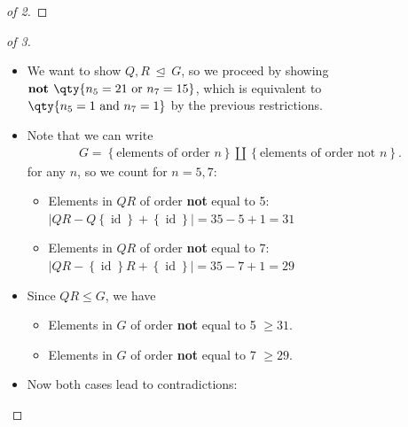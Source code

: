 \begin{solution}
\begin{proof}[of 2]
\end{proof}


\begin{proof}[of 3]

\envlist

\begin{itemize}
\item
  We want to show \(Q, R{~\trianglelefteq~}G\), so we proceed by showing
  \(\textbf{not }\qty{n_5 = 21 \text{ or } n_7 = 15}\), which is
  equivalent to \(\qty{n_5 = 1 \text{ and } n_7 = 1}\) by the previous
  restrictions.
\item
  Note that we can write
  \begin{align*}
  G = \left\{{\text{elements of order } n}\right\} {\coprod}\left\{{\text{elements of order not } n}\right\}
  .\end{align*}
  for any \(n\), so we count for \(n=5, 7\):

  \begin{itemize}
  \tightlist
  \item
    Elements in \(QR\) of order \textbf{not} equal to 5:
    \({\left\lvert {QR - Q\left\{{\operatorname{id}}\right\} + \left\{{\operatorname{id}}\right\}} \right\rvert} = 35 - 5 + 1 = 31\)
  \item
    Elements in \(QR\) of order \textbf{not} equal to 7:
    \({\left\lvert {QR - \left\{{\operatorname{id}}\right\}R + \left\{{\operatorname{id}}\right\}} \right\rvert} = 35 - 7 + 1 = 29\)
  \end{itemize}
\item
  Since \(QR \leq G\), we have

  \begin{itemize}
  \tightlist
  \item
    Elements in \(G\) of order \textbf{not} equal to 5 \(\geq 31\).
  \item
    Elements in \(G\) of order \textbf{not} equal to 7 \(\geq 29\).
  \end{itemize}
\item
  Now both cases lead to contradictions:


\end{itemize}
\end{proof}
\end{solution}
